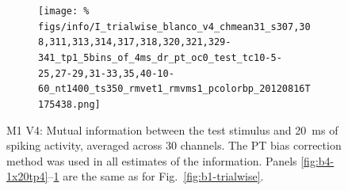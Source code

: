\begin{figure}[htbp]
\begin{subfigure}[b]{0.5\linewidth}
        \centering
        \caption{}
        \label{fig:b4-5x4tp1}
        \texttt{[image: \%
figs/info/I\_trialwise\_blanco\_v4\_chmean31\_s307,308,311,313,314,317,318,320,321,329-341\_tp1\_5bins\_of\_4ms\_dr\_pt\_oc0\_test\_tc10-5-25,27-29,31-33,35,40-10-60\_nt1400\_ts350\_rmvet1\_rmvms1\_pcolorbp\_20120816T175438.png]}
    \end{subfigure}
    \caption{\ac{M1} \ac{V4}: Mutual information between the test stimulus and \SI{20}{ms} of spiking activity, averaged across 30 channels.
The \ac{PT} bias correction method was used in all estimates of the information.
Panels \ref{fig:b4-1x20tp4}--\ref{fig:b4-5x4tp1} are the same as for Fig.~\ref{fig:b1-trialwise}.
}
    \label{fig:b4-trialwise}
\end{figure}




